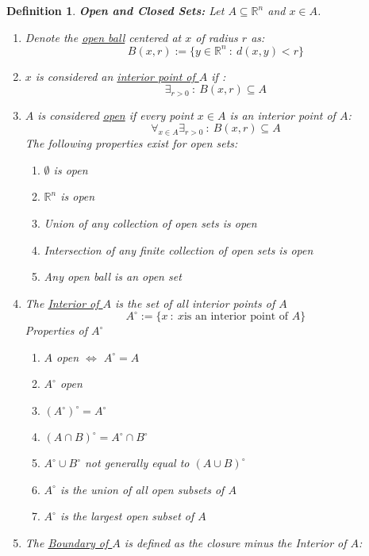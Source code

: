 \documentclass[]{article}
\newcommand{\R}{\mathbb{R}}
\newcommand{\st}{\ : \ }
\newtheorem{definition}{Definition}
\begin{document}
\begin{definition}
    \emph{\textbf{Open and Closed Sets:}} 
    Let $A \subseteq \R^n$ and $x \in A$.
    \begin{enumerate}
        \item Denote the \emph{\underline{open ball}} centered at $x$ of radius $r$ as: \[
            B(x,r) := \{
                y \in \R^n \st d(x,y) < r
            \}
        \] \item $x$ is considered an \emph{\underline{interior point of $A$}} if :\[
            \exists_{r > 0} \st B(x,r) \subseteq A
        \] \item  $A$ is considered \emph{\underline{open}} if every point $x \in A$ is an interior point of $A$: \[
            \forall_{x \in A} \exists_{r>0} \st B(x,r) \subseteq A
        \] The following properties exist for open sets:\begin{enumerate}
            \item $\emptyset$ is open
            \item $\R^n$ is open
            \item Union of any collection of open sets is open
            \item Intersection of any finite collection of open sets is open
            \item Any open ball is an open set
        \end{enumerate}
        \item The \emph{\underline{Interior of $A$}} is the set of all interior points of $A$ \[
            A^\circ := \{
                x \st x \text{is an interior point of $A$}
            \}
        \] Properties of $A^\circ$ \begin{enumerate}
            \item $A$ open $\iff$ $A^\circ = A$
            \item $A^\circ$ open
            \item $(A^\circ)^\circ = A^\circ$
            \item $(A \cap B)^\circ = A^\circ \cap B^\circ$
            \item $A^\circ \cup B^\circ$ not generally equal to $(A \cup B)^\circ$
            \item $A^\circ$ is the union of all open subsets of $A$
            \item $A^\circ$ is the largest open subset of $A$
        \end{enumerate}
        \item The \emph{\underline{Boundary of $A$}} is defined as the closure minus the Interior of $A$:\[
\]
\end{enumerate}
\end{definition}
\end{document}

